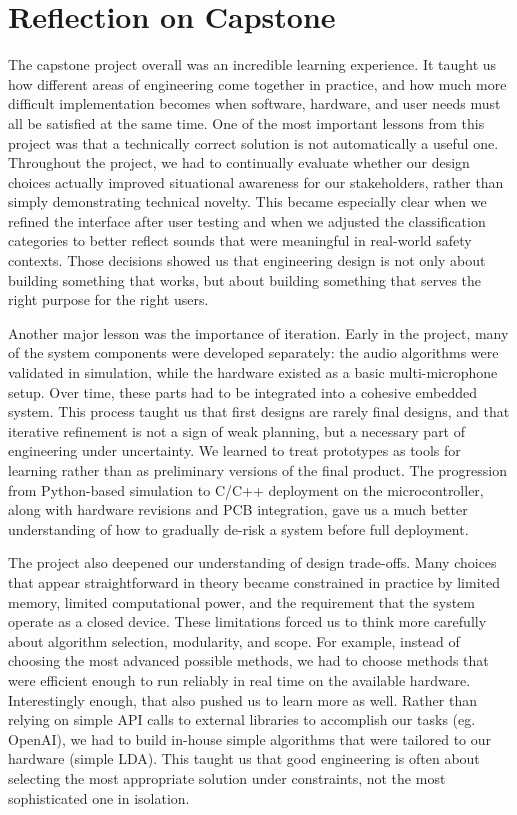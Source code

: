 \documentclass{article}
\begin{document}
\section{Reflection on Capstone}

The capstone project overall was an incredible learning experience. It taught 
us how different areas of engineering come together in practice, and how much 
more difficult implementation becomes when software, hardware, and user needs 
must all be satisfied at the same time. One of the most important lessons from 
this project was that a technically correct solution is not automatically a 
useful one. Throughout the project, we had to continually evaluate whether our 
design choices actually improved situational awareness for our stakeholders, 
rather than simply demonstrating technical novelty. This became especially 
clear when we refined the interface after user testing and when we adjusted 
the classification categories to better reflect sounds that were meaningful 
in real-world safety contexts. Those decisions showed us that engineering 
design is not only about building something that works, but about building 
something that serves the right purpose for the right users.

Another major lesson was the importance of iteration. Early in the project, 
many of the system components were developed separately: the audio algorithms 
were validated in simulation, while the hardware existed as a basic 
multi-microphone setup. Over time, these parts had to be integrated into a 
cohesive embedded system. This process taught us that first designs are rarely 
final designs, and that iterative refinement is not a sign of weak planning, 
but a necessary part of engineering under uncertainty. We learned to treat 
prototypes as tools for learning rather than as preliminary versions of the 
final product. The progression from Python-based simulation to C/C++ deployment 
on the microcontroller, along with hardware revisions and PCB integration, gave 
us a much better understanding of how to gradually de-risk a system before full 
deployment.

The project also deepened our understanding of design trade-offs. Many choices 
that appear straightforward in theory became constrained in practice by limited 
memory, limited computational power, and the requirement that the system 
operate as a closed device. These limitations forced us to think more carefully 
about algorithm selection, modularity, and scope. For example, instead of 
choosing the most advanced possible methods, we had to choose methods that 
were efficient enough to run reliably in real time on the available hardware. 
Interestingly enough, that also pushed us to learn more as well. Rather than 
relying on simple API calls to external libraries to accomplish our tasks 
(eg. OpenAI), we had to build in-house simple algorithms that were tailored 
to our hardware (simple LDA). This taught us that good engineering is often 
about selecting the most appropriate solution under constraints, not the most 
sophisticated one in isolation.
\end{document}
